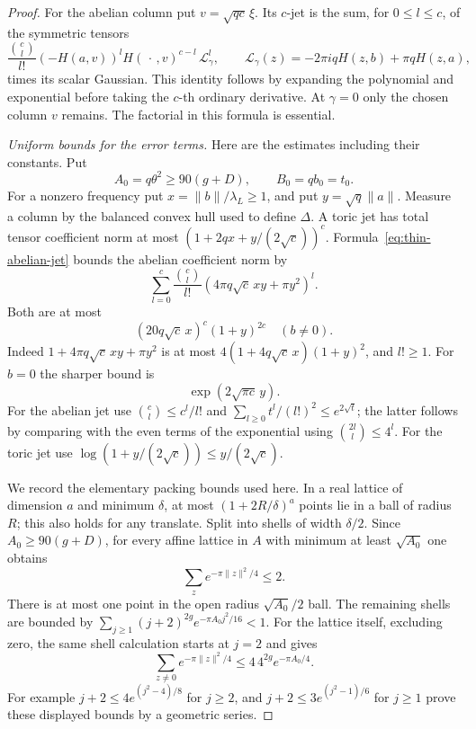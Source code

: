 \begin{proof}
For the abelian column put $v=\sqrt{qc}\,\xi$.  Its $c$-jet
is the sum, for $0\le l\le c$, of the symmetric tensors
\begin{equation}\label{eq:thin-abelian-jet}
       \frac{\binom cl}{l!}(-H(a,v))^l
                  H(\,\cdot\,,v)^{c-l}\,\mathcal L_\gamma^l,
 \qquad \mathcal L_\gamma(z)=-2\pi iqH(z,b)+\pi qH(z,a),
\end{equation}
times its scalar Gaussian.  This identity follows by expanding
the polynomial and exponential before taking the $c$-th
ordinary derivative.  At $\gamma=0$ only the chosen column
$v$ remains.  The factorial in this formula is essential.

\emph{Uniform bounds for the error terms.}
Here are the estimates including their constants.  Put
\[
              A_0=q\theta^2\ge90(g+D),\qquad B_0=qb_0=t_0.
\]
For a nonzero frequency put $x=\|b\|/\lambda_L\ge1$, and
put $y=\sqrt q\|a\|$.  Measure a column by the balanced convex
hull used to define $\Delta$.  A toric jet has total tensor
coefficient norm at most
$(1+2qx+y/(2\sqrt c))^c$.
Formula~\eqref{eq:thin-abelian-jet} bounds the abelian coefficient
norm by
\[
 \sum_{l=0}^c\frac{\binom cl}{l!}
                  (4\pi q\sqrt c\,xy+\pi y^2)^l.
\]
Both are at most
\begin{equation}\label{eq:thin-nonzero-frequency-polynomial}
                    (20q\sqrt c\,x)^c(1+y)^{2c}
                         \quad(b\ne0).
\end{equation}
Indeed $1+4\pi q\sqrt c\,xy+\pi y^2$ is at most
$4(1+4q\sqrt c\,x)(1+y)^2$, and $l!\ge1$.
For $b=0$ the sharper bound is
\begin{equation}\label{eq:thin-zero-frequency-polynomial}
                         \exp(2\sqrt{\pi c}\,y).
\end{equation}
For the abelian jet use $\binom cl\le c^l/l!$ and
$\sum_{l\ge0}t^l/(l!)^2\le e^{2\sqrt t}$; the latter follows
by comparing with the even terms of the exponential using
$\binom{2l}l\le4^l$.  For the toric jet use
$\log(1+y/(2\sqrt c))\le y/(2\sqrt c)$.

We record the elementary packing bounds used here.  In a real
lattice of dimension $a$ and minimum $\delta$, at most
$(1+2R/\delta)^a$ points lie in a ball of radius $R$; this
also holds for any translate.  Split into shells of width
$\delta/2$.  Since $A_0\ge90(g+D)$, for every affine lattice
in $A$ with minimum at least $\sqrt{A_0}$ one obtains
\[
                         \sum_z e^{-\pi\|z\|^2/4}\le2.
\]
There is at most one point in the open radius $\sqrt{A_0}/2$
ball.  The remaining shells are bounded by
$\sum_{j\ge1}(j+2)^{2g}e^{-\pi A_0j^2/16}<1$.
For the lattice itself, excluding zero, the same shell calculation
starts at $j=2$ and gives
\[
                  \sum_{z\ne0}e^{-\pi\|z\|^2/4}
                         \le4\,4^{2g}e^{-\pi A_0/4}.
\]
For example $j+2\le4e^{(j^2-4)/8}$ for $j\ge2$,
and $j+2\le3e^{(j^2-1)/6}$ for $j\ge1$ prove these displayed
bounds by a geometric series.


\end{proof}

